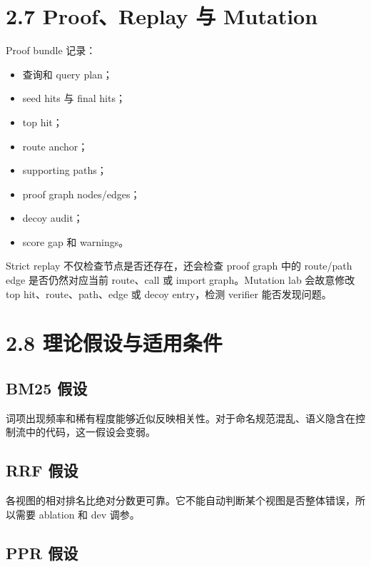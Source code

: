 \documentclass[UTF8,12pt,openany]{ctexbook}
\begin{document}
\section{2.7 Proof、Replay 与 Mutation}

Proof bundle 记录：\par

\begin{itemize}
\item 查询和 query plan；
\item seed hits 与 final hits；
\item top hit；
\item route anchor；
\item supporting paths；
\item proof graph nodes/edges；
\item decoy audit；
\item score gap 和 warnings。
\end{itemize}

Strict replay 不仅检查节点是否还存在，还会检查 proof graph 中的 route/path edge 是否仍然对应当前 route、call 或 import graph。Mutation lab 会故意修改 top hit、route、path、edge 或 decoy entry，检测 verifier 能否发现问题。\par

\section{2.8 理论假设与适用条件}

\subsection{BM25 假设}

词项出现频率和稀有程度能够近似反映相关性。对于命名规范混乱、语义隐含在控制流中的代码，这一假设会变弱。\par

\subsection{RRF 假设}

各视图的相对排名比绝对分数更可靠。它不能自动判断某个视图是否整体错误，所以需要 ablation 和 dev 调参。\par

\subsection{PPR 假设}
\end{document}

